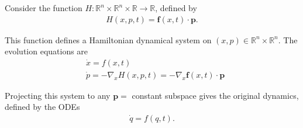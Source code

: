 \begin{solution}[8.4]
Consider the function $H:\mathbb{R}^n \times \mathbb{R}^n\times \mathbb{R} \to \mathbb{R}$, defined by
\begin{align}
H(x,p,t) = \mathbf{f}(x,t)\cdot \mathbf{p}.
\end{align}

This function defines a Hamiltonian dynamical system on $(x,p)\in \mathbb{R}^n\times \mathbb{R}^n$. The evolution equations are
\begin{align}
    &\dot{x} = f(x,t) \\
    &\dot{p} = -\nabla_x H(x,p,t) = -\nabla_x \mathbf{f}(x,t)\cdot \mathbf{p}
\end{align}

Projecting this system to any $\mathbf{p} =$ constant subspace gives the original dynamics, defined by the ODEs
\begin{align}
\dot{q} = f(q,t).
\end{align}
\end{solution}

